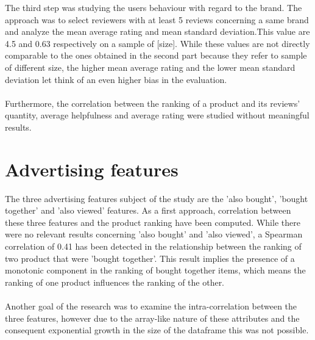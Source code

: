 \documentclass[11pt]{article}
\begin{document}
The third step was studying the users behaviour with regard to the brand. The approach was to select reviewers with at least 5 reviews concerning a same brand and analyze the mean average rating and mean standard deviation.This value are 4.5 and 0.63 respectively on a sample of [size]. While these values are not directly comparable to the ones obtained in the second part because they refer to sample of different size, the higher mean average rating and the lower mean standard deviation let think of an even higher bias in the evaluation.\\\\
Furthermore, the correlation between the ranking of a product and its reviews' quantity, average helpfulness and average rating were studied without meaningful results.

\section{Advertising features}
  The three advertising features subject of the study are the 'also bought', 'bought together' and 'also viewed' features. As a first approach, correlation between these three features and the product ranking have been computed. While there were no relevant results concerning 'also bought' and 'also viewed', a Spearman correlation of 0.41 has been detected in the relationship between the ranking of two product that were 'bought together'. This result implies the presence of a monotonic component in the ranking of bought together items, which means the ranking of one product influences the ranking of the other. \\\\
Another goal of the research was to examine the intra-correlation between the three features, however due to the array-like nature of these attributes and the consequent exponential growth in the size of the dataframe this was not possible.
\end{document}
